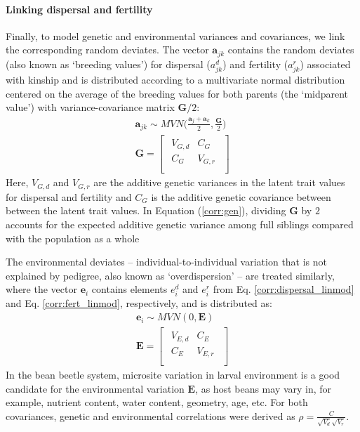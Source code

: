 \documentclass[11pt]{article}
\begin{document}
\paragraph{Linking dispersal and fertility}
Finally, to model genetic and environmental variances and covariances, we link the corresponding random deviates.
The vector $\bm{a}_{jk}$ contains the random deviates (also known as `breeding values') for dispersal ($a^{d}_{jk}$) and fertility ($a^{r}_{jk}$) associated with kinship and is distributed according to a multivariate normal distribution centered on the average of the breeding values for both parents (the `midparent value') with variance-covariance matrix $\bm{G}/2$:
%
\begin{gather} \label{corr:gen}
  \bm{a}_{jk} \sim \mathit{MVN} \Big( \frac{\bm{a}_{j} + \bm{a}_{k}}{2}, \frac{\bm{G}}{2} \Big) \\[10pt]
  \bm{G} =
  \begin{bmatrix}
    \begin{array}{ll}
      V_{G,d} &C_{G}   \\
      C_{G}   &V_{G,r} \\
    \end{array}
  \end{bmatrix}
\end{gather}
%
Here, $V_{G,d}$ and $V_{G,r}$ are the additive genetic variances in the latent trait values for dispersal and fertility and $C_{G}$ is the additive genetic covariance between between the latent trait values.
In Equation (\ref{corr:gen}), dividing $\bm{G}$ by $2$ accounts for the expected additive genetic variance among full siblings compared with the population as a whole \citep{roughgarden_theory_1979}

The environmental deviates -- individual-to-individual variation that is not explained by pedigree, also known as `overdispersion' \citep{de2016general} -- are treated similarly, where the vector $\bm{e}_{i}$ contains elements $e^{d}_{i}$ and $e^{r}_{i}$ from Eq. \ref{corr:dispersal_linmod} and Eq. \ref{corr:fert_linmod}, respectively, and is distributed as:
%
\begin{gather} \label{corr:env}
  \bm{e}_{i} \sim \mathit{MVN} (0, \bm{E}) \\[5pt]
  \bm{E} =
  \begin{bmatrix}
    \begin{array}{ll}
      V_{E,d} &C_{E}   \\
      C_{E}   &V_{E,r} \\
    \end{array}
  \end{bmatrix}
\end{gather}
%
In the bean beetle system, microsite variation in larval environment is a good candidate for the environmental variation $\bm{E}$, as host beans may vary in, for example, nutrient content, water content, geometry, age, etc.
For both covariances, genetic and environmental correlations were derived as $\rho = \frac{C}{\sqrt{V_{d}}\sqrt{V_{r}}}$. 
\end{document}
